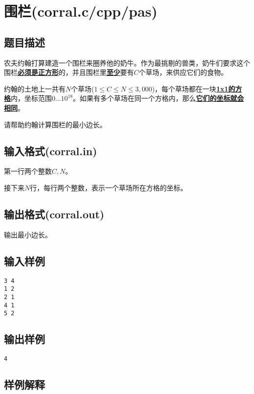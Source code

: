 \documentclass[hyperref,UTF8,12pt,a4paper]{ctexart}
\begin{document}
\newpage

\section{围栏(corral.c/cpp/pas)}

\subsection{题目描述}

农夫约翰打算建造一个围栏来圈养他的奶牛。作为最挑剔的兽类，奶牛们要求这个围栏\underline{\textbf{必须是正方形}}的，并且围栏里\underline{\textbf{至少}}要有$C$个草场，来供应它们的食物。

约翰的土地上一共有$N$个草场($1\le C\le N\le3,000$)，每个草场都在一块\underline{\textbf{1x1的方}}\\\underline{\textbf{格}}内，坐标范围$0\dots10^{18}$。如果有多个草场在同一个方格内，那么\underline{\textbf{它们的坐标就会相同}}。

请帮助约翰计算围栏的最小边长。

\subsection{输入格式(corral.in)}

第一行两个整数$C,N$。

接下来$N$行，每行两个整数，表示一个草场所在方格的坐标。

\subsection{输出格式(corral.out)}

输出最小边长。

\subsection{输入样例}

\begin{verbatim}
3 4
1 2
2 1
4 1
5 2
\end{verbatim}

\subsection{输出样例}

\begin{verbatim}
4
\end{verbatim}

\subsection{样例解释}
\end{document}
